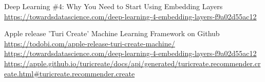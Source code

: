 \documentclass[12pt]{article}
\begin{document}
\begin{thebibliography}{12}
    Deep Learning \#4: Why You Need to Start Using Embedding Layers
    \\\url{https://towardsdatascience.com/deep-learning-4-embedding-layers-f9a02d55ac12}

    Apple release 'Turi Create' Machine Learning Framework on Github
    \\\url{https://todobi.com/apple-release-turi-create-machine/}
    \\\url{https://towardsdatascience.com/deep-learning-4-embedding-layers-f9a02d55ac12}
    \\\url{https://apple.github.io/turicreate/docs/api/generated/turicreate.recommender.create.html#turicreate.recommender.create}

    \end{thebibliography}
\end{document}
